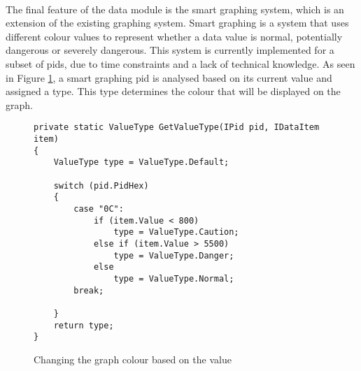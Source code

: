 {		\paragraph{}{
		The final feature of the data module is the smart graphing system, which is an extension of the existing graphing system. Smart graphing is a system that uses different colour values to represent whether a data value is normal, potentially dangerous or severely dangerous. This system is currently implemented for a subset of pids, due to time constraints and a lack of technical knowledge. As seen in Figure \ref{code:ValueType}, a smart graphing pid is analysed based on its current value and assigned a type. This type determines the colour that will be displayed on the graph.
		}			
		
		\begin{figure}[h]
			\begin{lstlisting}		
private static ValueType GetValueType(IPid pid, IDataItem item)
{
	ValueType type = ValueType.Default;
				
	switch (pid.PidHex)
	{
		case "0C":		
			if (item.Value < 800)
				type = ValueType.Caution;
			else if (item.Value > 5500)
				type = ValueType.Danger;
			else
				type = ValueType.Normal;
		break;

	}
	return type;
}
			\end{lstlisting}
			\caption{Changing the graph colour based on the value}
			\label{code:ValueType}
		\end{figure}		
		
		
		\label{ssec:DataModuleDesc}
	}

